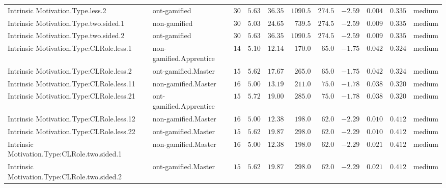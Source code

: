 \documentclass[6pt,a4paper]{article}
\begin{document}
\begin{landscape}
{\begin{longtable}{llrrrrrrrrl}
Intrinsic Motivation.Type.less.2&ont-gamified&$30$&$5.63$&$36.35$&$1090.5$&$274.5$&$-2.59$&$0.004$&$0.335$&medium\tabularnewline
Intrinsic Motivation.Type.two.sided.1&non-gamified&$30$&$5.03$&$24.65$&$ 739.5$&$274.5$&$-2.59$&$0.009$&$0.335$&medium\tabularnewline
Intrinsic Motivation.Type.two.sided.2&ont-gamified&$30$&$5.63$&$36.35$&$1090.5$&$274.5$&$-2.59$&$0.009$&$0.335$&medium\tabularnewline
Intrinsic Motivation.Type:CLRole.less.1&non-gamified.Apprentice&$14$&$5.10$&$12.14$&$ 170.0$&$ 65.0$&$-1.75$&$0.042$&$0.324$&medium\tabularnewline
Intrinsic Motivation.Type:CLRole.less.2&ont-gamified.Master&$15$&$5.62$&$17.67$&$ 265.0$&$ 65.0$&$-1.75$&$0.042$&$0.324$&medium\tabularnewline
Intrinsic Motivation.Type:CLRole.less.11&non-gamified.Master&$16$&$5.00$&$13.19$&$ 211.0$&$ 75.0$&$-1.78$&$0.038$&$0.320$&medium\tabularnewline
Intrinsic Motivation.Type:CLRole.less.21&ont-gamified.Apprentice&$15$&$5.72$&$19.00$&$ 285.0$&$ 75.0$&$-1.78$&$0.038$&$0.320$&medium\tabularnewline
Intrinsic Motivation.Type:CLRole.less.12&non-gamified.Master&$16$&$5.00$&$12.38$&$ 198.0$&$ 62.0$&$-2.29$&$0.010$&$0.412$&medium\tabularnewline
Intrinsic Motivation.Type:CLRole.less.22&ont-gamified.Master&$15$&$5.62$&$19.87$&$ 298.0$&$ 62.0$&$-2.29$&$0.010$&$0.412$&medium\tabularnewline
Intrinsic Motivation.Type:CLRole.two.sided.1&non-gamified.Master&$16$&$5.00$&$12.38$&$ 198.0$&$ 62.0$&$-2.29$&$0.021$&$0.412$&medium\tabularnewline
Intrinsic Motivation.Type:CLRole.two.sided.2&ont-gamified.Master&$15$&$5.62$&$19.87$&$ 298.0$&$ 62.0$&$-2.29$&$0.021$&$0.412$&medium\tabularnewline
\hline
\end{longtable}}

\end{landscape}
\end{document}

